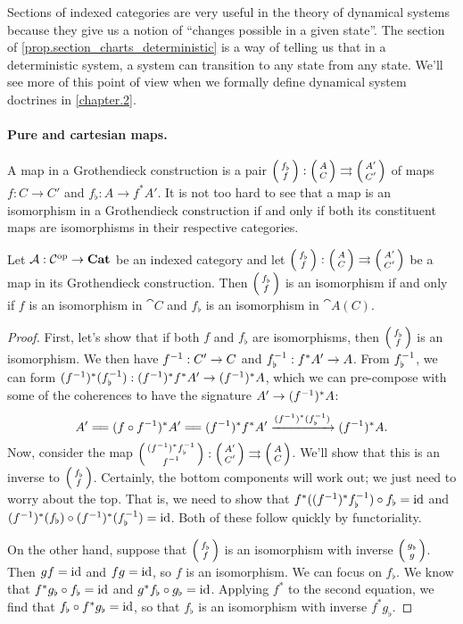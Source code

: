 \documentclass[DynamicalBook]{subfiles}
\begin{document}
\begin{remark}
  Sections of indexed categories are very useful in the theory of dynamical
  systems because they give us a notion of ``changes possible in a given
  state''. The section of \cref{prop.section_charts_deterministic} is a way of
  telling us that in a deterministic system, a system can transition to any
  state from any state. We'll see more of this point of view when we formally
  define dynamical system doctrines in \cref{chapter.2}.
\end{remark}


\paragraph{Pure and cartesian maps.}\label{sec.pure_and_cartesian_maps}

A map in a Grothendieck construction is a pair $\lens{f_{\flat}}{f} :
\lens{A}{C} \tto \lens{A'}{C'}$ of maps $f : C \to C'$ and $f_{\flat}: A \to
f^{\ast}A'$. It is not too hard to see that a map is an isomorphism in a Grothendieck
construction if and only if both its constituent maps are isomorphisms in their
respective categories.

\begin{proposition}\label{prop.isomorphism_in_groth_construction}
Let $\mathcal{A} : \mathcal{C}^{\textnormal{op}} \to \textbf{Cat}$ be an indexed category and let $\lens{f_{\flat}}{f} :
\lens{A}{C} \tto \lens{A'}{C'}$ be a map in its Grothendieck construction. Then
$\lens{f_{\flat}}{f}$ is an isomorphism if and only if $f$ is an isomorphism in
$\cat{C}$ and $f_{\flat}$ is an isomorphism in $\cat{A}(C)$.
\end{proposition}
\begin{proof}
First, let's show that if both $f$ and $f_{\flat}$ are isomorphisms, then
$\lens{f_{\flat}}{f}$ is an isomorphism. We then have $f^{-1} : C' \to C$ and
$f_{\flat}^{-1} : f^{\ast}A' \to A$. From $f_{\flat}^{-1}$, we can form
$(f^{-1})^{\ast} (f_{\flat}^{-1}) : (f^{-1})^{\ast}f^{\ast} A' \to
(f^{-1})^{\ast}A$, which we can pre-compose with some of the coherences to have
the signature $A' \to (f^{-1})^{\ast} A$:
$$A' \xequals{\,} (f \circ f\inv)^{\ast} A' \xequals{\,} 
(f\inv)^{\ast} f^{\ast} A' \xto{(f\inv)^{\ast} (f_{\flat}\inv)} (f\inv)^{\ast} A.$$
Now, consider the map $\lens{(f\inv)^{\ast}f_{\flat}\inv}{f\inv} : \lens{A'}{C'}
\tto \lens{A}{C}$. We'll show that this is an
inverse to $\lens{f_{\flat}}{f}$. Certainly, the bottom components will work
out; we just need to worry about the top. That is, we need to show that
$f^{\ast}((f^{-1})^{\ast} f_{\flat}^{-1}) \circ f_{\flat} = \mathrm{id}$ and
$(f^{-1})^{\ast}(f_{\flat}) \circ (f^{-1})^{\ast}(f_{\flat}^{-1}) = \mathrm{id}$. Both of
these follow quickly by functoriality.

On the other hand, suppose that $\lens{f_{\flat}}{f}$ is an isomorphism with
inverse $\lens{g_{\flat}}{g}$. Then $gf = \mathrm{id}$ and $fg = \mathrm{id}$, so $f$ is an
isomorphism. We can focus on $f_{\flat}$. We know that $f^{\ast}g_{\flat} \circ
f_{\flat} = \mathrm{id}$ and $g^{\ast}f_{\flat} \circ g_{\flat} = \mathrm{id}$. Applying
$f^{\ast}$ to the second equation, we find that $f_{\flat} \circ
f^{\ast}g_{\flat} = \mathrm{id}$, so that $f_{\flat}$ is an isomorphism with inverse $f^{\ast}g_{\flat}$.
\end{proof}  
\end{document}
